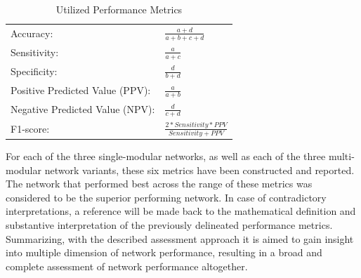 \documentclass[12pt]{article}
\begin{document}
\bgroup
\def\arraystretch{1.8}%
\begin{table}[h]
\caption{Utilized Performance Metrics}
\label{table:metrics}
\begin{tabular}{ll}
\hline
Accuracy:                       & \(\frac{\!\!\!\!\!\!\!\!\!\!\!\!\!\!a+d}{a+b+c+d}\) \\
Sensitivity:                    & \(\frac{a}{a+c}\)                                   \\
Specificity:                    & \(\frac{d}{b+d}\)                                   \\
Positive Predicted Value (PPV): & \(\frac{a}{a+b}\)                                   \\
Negative Predicted Value (NPV):       & \(\frac{d}{c+d}\)                                   \\
F1-score:                     & \(\frac{2*Sensitivity*PPV}{Sensitivity+PPV}\)       \\ \hline
\end{tabular}
\end{table}
\egroup

For each of the three single-modular networks, as well as each of the three multi-modular network variants, these six metrics have been constructed and reported. The network that performed best across the range of these metrics was considered to be the superior performing network. In case of contradictory interpretations, a reference will be made back to the mathematical definition and substantive interpretation of the previously delineated performance metrics. Summarizing, with the described assessment approach it is aimed to gain insight into multiple dimension of network performance, resulting in a broad and complete assessment of network performance altogether.     

\newpage


\end{document}
